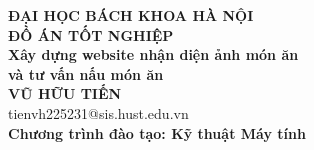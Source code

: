 \documentclass[DoAn.tex]{subfiles}
\begin{document}
\begin{titlepage}
\thispagestyle{empty}
\begin{center}

{\textbf{\large{ĐẠI HỌC BÁCH KHOA HÀ NỘI}}}\\[4cm]

{\textbf{\huge{ĐỒ ÁN TỐT NGHIỆP}}}\\[1cm]

{\textbf{\Large{Xây dựng website nhận diện ảnh món ăn\\ và tư vấn nấu món ăn}}}\\[1cm]

{\textbf{\large{VŨ HỮU TIẾN}}}\\
{\large{tienvh225231@sis.hust.edu.vn}}\\[0.5cm]

{\textbf{\large{Chương trình đào tạo: Kỹ thuật Máy tính}}}\\

\vspace{4cm}

\begin{table}[H]
\centering
{}
\end{table}
\end{center}
\end{titlepage}
\end{document}
